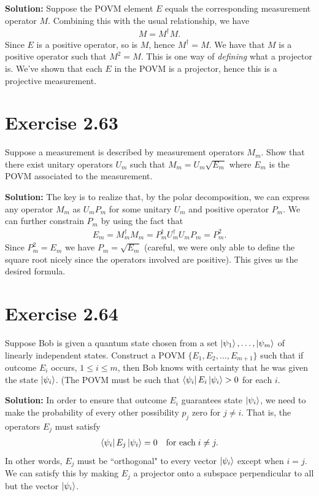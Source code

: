 \documentclass{book}
\begin{document}
    \textbf{Solution:} Suppose the POVM element $E$ equals the corresponding measurement operator $M$. Combining this with the usual relationship, we have
    \begin{align}
        M = M^\dagger M.
    \end{align}
    Since $E$ is a positive operator, so is $M$, hence $M^\dagger = M$. We have that $M$ is a positive operator such that $M^2 = M$. This is one way of \emph{defining} what a projector is. We've shown that each $E$ in the POVM is a projector, hence this is a projective measurement.

\section*{Exercise 2.63}
    Suppose a measurement is described by measurement operators $M_m$. Show that there exist unitary operators $U_m$ such that $M_m = U_m \sqrt{E_m}$ where $E_m$ is the POVM associated to the measurement.

    \textbf{Solution:} The key is to realize that, by the polar decomposition, we can express any operator $M_m$ as $U_m P_m$ for some unitary $U_m$ and positive operator $P_m$. We can further constrain $P_m$ by using the fact that
    \begin{align}
        E_m = M_m^\dagger M_m = P_m^\dagger U_m^\dagger U_m P_m = P_m^2. 
    \end{align}
    Since $P_m^2 = E_m$ we have $P_m = \sqrt{E_m}$ (careful, we were only able to define the square root nicely since the operators involved are positive). This gives us the desired formula.

\section*{Exercise 2.64}
    Suppose Bob is given a quantum state chosen from a set $\ket{\psi_1},\dots, \ket{\psi_m}$ of linearly independent states. Construct a POVM $\{E_1, E_2, \dots, E_{m+1}\}$ such that if outcome $E_i$ occurs, $1 \leq i \leq m$, then Bob knows with certainty that he was given the state $\ket{\psi_i}$. (The POVM must be such that $\bra{\psi_i}E_i \ket{\psi_i} > 0$ for each $i$.

    \textbf{Solution:} In order to ensure that outcome $E_i$ guarantees state $\ket{\psi_i}$, we need to make the probability of every other possibility $p_j$ zero for $j \neq i$. That is, the operators $E_j$ must satisfy
    \begin{align} \label{eq:2.64_condition}
        \bra{\psi_i}E_j \ket{\psi_i} = 0 \quad \text{for each}\;i \neq j.
    \end{align}
    In other words, $E_j$ must be ``orthogonal" to every vector $\ket{\psi_i}$ except when $i = j$. We can satisfy this by making $E_j$ a projector onto a subspace perpendicular to all but the vector $\ket{\psi_i}$. 
    
\end{document}
